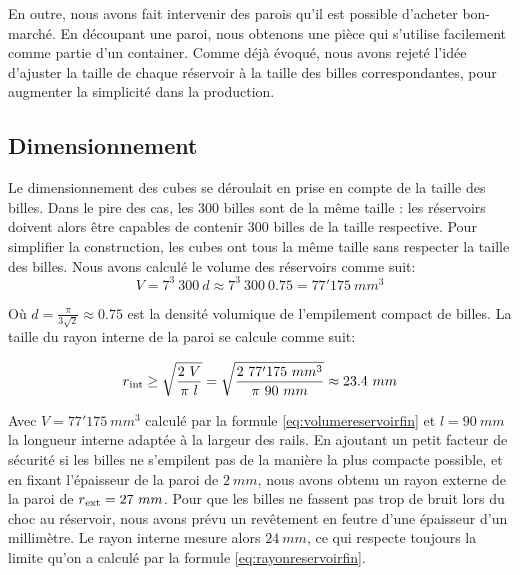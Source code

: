 En outre, nous avons fait intervenir des parois qu'il est possible d'acheter bon-marché. En découpant une paroi, nous obtenons une pièce qui s'utilise facilement comme partie d'un container. Comme déjà évoqué, nous avons rejeté l'idée d'ajuster la taille de chaque réservoir à la taille des billes correspondantes, pour augmenter la simplicité dans la production. 

\subsection{Dimensionnement}
Le dimensionnement des cubes se déroulait en prise en compte de la taille des billes. Dans le pire des cas, les 300 billes sont de la même taille : les réservoirs doivent alors être capables de contenir 300 billes de la taille respective. Pour simplifier la construction, les cubes ont tous la même taille sans respecter la taille des billes.
Nous avons calculé le volume des réservoirs comme suit:
\begin{equation}
    V = 7^3\ 300\ d \approx 7^3\ 300\ 0.75 = 77'175\ mm^3
    \label{eq:volumereservoirfin}
\end{equation}

Où \(d = \frac{ \pi }{3\sqrt{2}} \approx 0.75\) est la densité volumique de l'empilement compact de billes.
La taille du rayon interne de la paroi se calcule comme suit:

\begin{equation}r\textsubscript{int}\geq\sqrt{\frac{2\ V}{\pi\ l}}=\sqrt{\frac{2\ 77'175\ mm^3}{\pi\ 90\ mm}} \approx 23.4\ mm \label{eq:rayonreservoirfin}\end{equation}

Avec \(V=77'175\ mm^3\) calculé par la formule \ref{eq:volumereservoirfin} et \(l=90\ mm\) la longueur interne adaptée à la largeur des rails. En ajoutant un petit facteur de sécurité si les billes ne s'empilent pas de la manière la plus compacte possible, et en fixant l'épaisseur de la paroi de \(2\ mm \), nous avons obtenu un rayon externe de la paroi de \(r\textsubscript{ext}=27\ mm\). Pour que les billes ne fassent pas trop de bruit lors du choc au réservoir, nous avons prévu un revêtement en feutre d'une épaisseur d'un millimètre. Le rayon interne mesure alors \(24\ mm \), ce qui respecte toujours la limite qu'on a calculé par la formule \ref{eq:rayonreservoirfin}.

